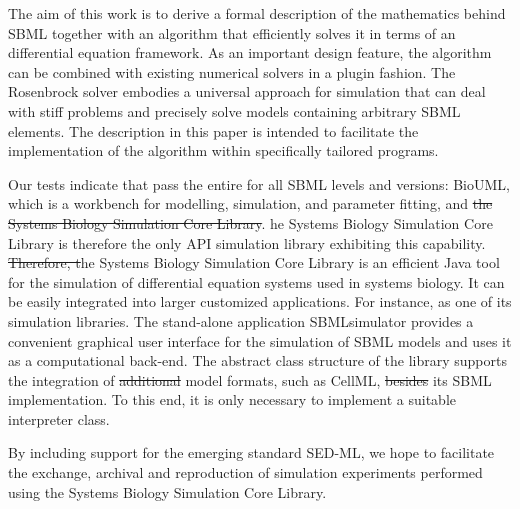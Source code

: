 \documentclass[10pt]{bmc_article}
\newenvironment{bmcformat}{\begin{raggedright}\baselineskip20pt\sloppy\setboolean{publ}{false}}{\end{raggedright}\baselineskip20pt\sloppy}
\begin{document}
\begin{bmcformat}
The aim of this work is to derive a formal description of the mathematics
behind \acs{SBML} together with an algorithm that efficiently solves it in
terms of an  differential equation framework.
As an important design feature, the algorithm can be combined with existing
numerical solvers in a plugin fashion. 
The Rosenbrock solver embodies a universal approach for
simulation that can deal with stiff problems and precisely solve models
containing arbitrary \acs{SBML} elements.
The description in this paper is intended to facilitate the implementation of
the algorithm within specifically tailored programs.

Our tests indicate that  pass the
entire  for all \acs{SBML} levels and versions: BioUML, which is
a workbench for modelling, simulation, and parameter fitting, and
\sout{the Systems Biology Simulation Core Library}.
he
Systems Biology Simulation Core Library\COR{,} is therefore the only \acs{API}
simulation library exhibiting this capability.
%
\sout{Therefore, t}he Systems Biology Simulation Core
Library is an efficient Java tool for the simulation of differential equation
systems used in systems biology.
It can be easily integrated into larger customized applications.
For instance,  as one of its  simulation libraries.
The stand-alone application SBMLsimulator 
provides a convenient graphical user interface for the simulation of \acs{SBML}
models and uses it as a computational back-end.
The abstract class structure of the library supports the integration of
\sout{additional} model formats, such as CellML,
\sout{besides} its \acs{SBML} implementation.
To this end, it is only necessary to implement a suitable interpreter class.



By including support for the emerging standard \acs{SED-ML}, we hope to
facilitate the exchange, archival and reproduction of simulation experiments
performed using the Systems Biology Simulation Core Library.


\end{bmcformat}
\end{document}
